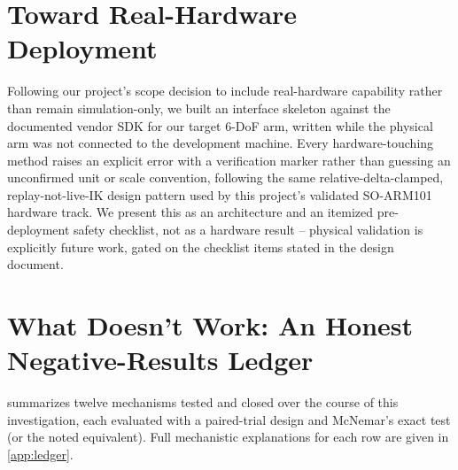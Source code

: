 \documentclass[journal]{IEEEtran}
\begin{document}
\section{Toward Real-Hardware Deployment}
\label{sec:hardware}

Following our project's scope decision to include real-hardware
capability rather than remain simulation-only, we built an interface
skeleton against the documented vendor SDK for our target 6-DoF arm,
written while the physical arm was not connected to the development
machine. Every hardware-touching method raises an explicit error with a
verification marker rather than guessing an unconfirmed unit or scale
convention, following the same relative-delta-clamped,
replay-not-live-IK design pattern used by this project's validated
SO-ARM101 hardware track. We present this as an architecture and an
itemized pre-deployment safety checklist, not as a hardware result --
physical validation is explicitly future work, gated on the checklist
items stated in the design document.

\section{What Doesn't Work: An Honest Negative-Results Ledger}
\label{sec:negative}

 summarizes twelve mechanisms tested and closed over the
course of this investigation, each evaluated with a paired-trial design
and McNemar's exact test (or the noted equivalent). Full mechanistic
explanations for each row are given in \cref{app:ledger}.
\end{document}
